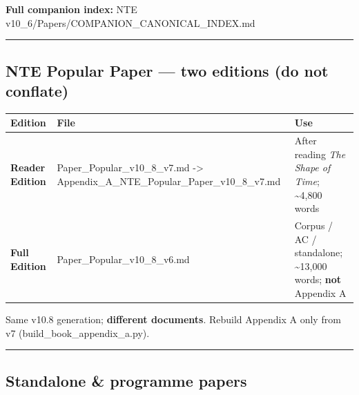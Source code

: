 \documentclass[
  11pt,
]{article}
\newcounter{none} %
\begin{document}
\textbf{Full companion index:} NTE
v10\_6/Papers/COMPANION\_CANONICAL\_INDEX.md

\begin{center}\rule{0.5\linewidth}{0.5pt}\end{center}

\subsection{NTE Popular Paper --- two editions (do not
conflate)}\label{nte-popular-paper-two-editions-do-not-conflate}

{\def\LTcaptype{none} %
\begin{longtable}[]{@{}
  >{\raggedright\arraybackslash}p{}
  >{\raggedright\arraybackslash}p{}
  >{\raggedright\arraybackslash}p{}@{}}
\toprule\noalign{}
\begin{minipage}[b]{\linewidth}\raggedright
Edition
\end{minipage} & \begin{minipage}[b]{\linewidth}\raggedright
File
\end{minipage} & \begin{minipage}[b]{\linewidth}\raggedright
Use
\end{minipage} \\
\midrule\noalign{}
\endhead
\bottomrule\noalign{}
\endlastfoot
\textbf{Reader Edition} &
Paper\_\allowbreak{}Popular\_\allowbreak{}v10\_\allowbreak{}8\_\allowbreak{}v7.md
-\textgreater{}
Appendix\_\allowbreak{}A\_\allowbreak{}NTE\_\allowbreak{}Popular\_\allowbreak{}Paper\_\allowbreak{}v10\_\allowbreak{}8\_\allowbreak{}v7.md
& After reading \emph{The Shape of Time}; \textasciitilde4,800 words \\
\textbf{Full Edition} &
Paper\_\allowbreak{}Popular\_\allowbreak{}v10\_\allowbreak{}8\_\allowbreak{}v6.md
& Corpus /\allowbreak{} AC /\allowbreak{} standalone;
\textasciitilde13,000 words; \textbf{not} Appendix A \\
\end{longtable}
}

Same v10.8 generation; \textbf{different documents}. Rebuild Appendix A
only from v7 (build\_book\_appendix\_a.py).

\begin{center}\rule{0.5\linewidth}{0.5pt}\end{center}

\subsection{Standalone \& programme
papers}\label{standalone-programme-papers}
\end{document}
